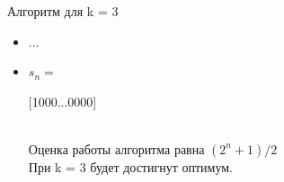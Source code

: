 \documentclass{beamer}
\begin{document}
\begin{frame}{Алгоритм для k = 3}
\begin{itemize}
{  }
  \item <6->{...}
  \item <7->{
        \begin{minipage}{0.4\textwidth}
        \begin{math} s_n = 
        \end{math}
        \end{minipage}
        \hfill
        \begin{minipage}{0.4\textwidth}
        [1000...0000]
        \end{minipage} \\
  Оценка работы алгоритма равна $(2^n + 1) / 2$ \\
  При k = 3 будет достигнут оптимум.
  }
  \end{itemize}
\end{frame}

 
    
\end{document}
